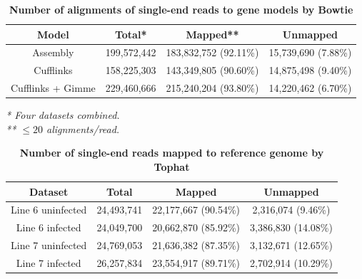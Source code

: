 \documentclass[10pt]{article}
\begin{document}
\begin{table}[!ht]
\caption{
\bf{Number of alignments of single-end reads to gene models by Bowtie}}
\begin{tabular}{cccc}
\hline
Model & Total* & Mapped** & Unmapped \\ 
\hline
Assembly & 199,572,442 & 183,832,752 (92.11\%) & 15,739,690 (7.88\%) \\
Cufflinks & 158,225,303 & 143,349,805 (90.60\%)& 14,875,498 (9.40\%) \\
Cufflinks + Gimme & 229,460,666 & 215,240,204 (93.80\%)& 14,220,462 (6.70\%) \\
\hline
\end{tabular}
\begin{flushleft}\footnotesize \textit{* Four datasets combined.\\
** $\le20$ alignments/read.}
\end{flushleft}
\label{junction_read}
\end{table}

\begin{table}[!ht]
\caption{
\bf{Number of single-end reads mapped to reference genome by Tophat}}
\begin{tabular}{cccc}
\hline
Dataset & Total & Mapped & Unmapped \\ 
\hline
Line 6 uninfected & 24,493,741 & 22,177,667 (90.54\%)& 2,316,074 (9.46\%) \\
Line 6 infected & 24,049,700 & 20,662,870 (85.92\%)& 3,386,830 (14.08\%) \\
Line 7 uninfected & 24,769,053 & 21,636,382 (87.35\%)& 3,132,671 (12.65\%) \\
Line 7 infected & 26,257,834 & 23,554,917 (89.71\%)& 2,702,914 (10.29\%) \\
\hline
\end{tabular}
\label{junction_read}
\end{table}
\end{document}
